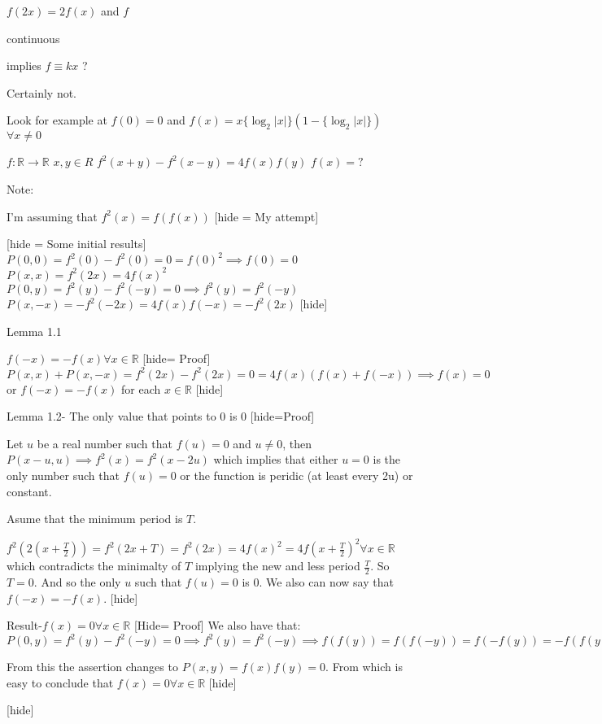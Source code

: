 \begin{solution}
	\begin{tcolorbox}$f(2x)=2f(x)$ and $f$ \begin{bolded}continuous\end{bolded} implies $f \equiv kx$ ?\end{tcolorbox}
Certainly not.

Look for example at $f(0)=0$ and $f(x)=x\{\log_2|x|\}(1-\{\log_2|x|\})$ $\forall x\ne 0$



\end{solution}



\begin{solution}
	\begin{tcolorbox}$f:\mathbb{R} \to \mathbb{R}$ $x,y\in R$
$f^2(x+y)-f^2(x-y)=4f(x)f(y)$
$f(x)=?$\end{tcolorbox}
\begin{bolded}Note:\end{bolded} I'm assuming that $f^2(x) = f(f(x))$
[hide = My attempt]


[hide = Some initial results]
$P(0,0) = f^2(0)-f^2(0) = 0 = f(0)^2 \implies f(0)=0$
$P(x,x) = f^2(2x) = 4f(x)^2$
$P(0,y) = f^2(y) - f^2(-y) = 0 \implies f^2(y) = f^2(-y)$
$P(x,-x) = -f^2(-2x) = 4f(x)f(-x) = -f^2(2x)$
[\/hide]

\begin{bolded}Lemma 1.1\end{bolded} $f(-x) = -f(x) \forall x \in \mathbb{R}$
[hide= Proof]
$P(x,x)+P(x,-x) = f^2(2x)-f^2(2x) = 0 = 4f(x)(f(x)+f(-x)) \implies f(x)=0$ or $f(-x)= -f(x)$ for each $x\in \mathbb{R}$
[\/hide]

Lemma 1.2- The only value that points to $0$ is $0$
[hide=Proof]

Let $u$ be a real number such that $f(u)=0$ and $u\not = 0$, then
$P(x-u,u) \implies f^2(x) = f^2(x-2u)$ which implies that either $u=0$ is the only number such that $f(u)=0$ or the function is peridic (at least every 2u) or constant.

Asume that the minimum period is $T$.

$f^2(2(x+\frac{T}{2})) = f^2(2x+T) = f^2(2x)= 4f(x)^2 = 4f(x+\frac{T}{2})^2 \forall x \in \mathbb{R}$ which contradicts the minimalty of $T$ implying the new and less period  $\frac{T}{2}$. So $T = 0$. And so the only $u$ such that $f(u)=0$ is $0$. We also can now say that $f(-x)=-f(x)$.
[\/hide]

Result-$f(x) = 0 \forall x \in \mathbb{R}$
[Hide= Proof]
We also have that:
$P(0,y) = f^2(y) - f^2(-y) = 0 \implies f^2(y) = f^2(-y) \implies f(f(y))= f(f(-y)) = f(-f(y)) = -f(f(y)) \implies f(f(y)) = 0 \forall y \in \mathbb{R}$

From this the assertion changes to $P(x,y) = f(x)f(y)= 0$. From which is easy to conclude that $f(x) = 0 \forall x\in \mathbb{R}$
[\/hide]
 
[\/hide]
\end{solution}




